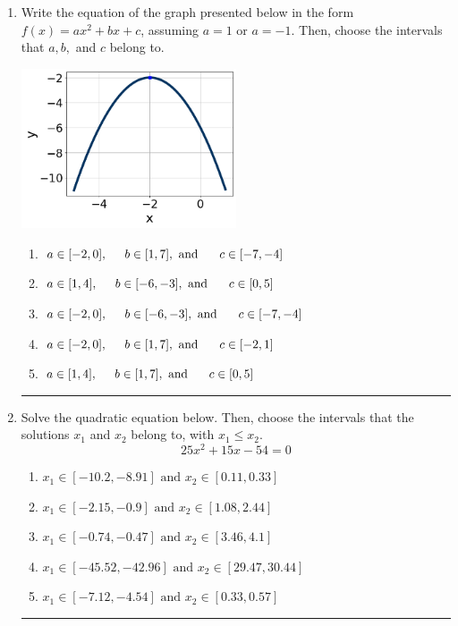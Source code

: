 \documentclass[14pt]{extbook}
\newcommand{\litem}[1]{\item#1\hspace*{-1cm}\rule{\textwidth}{0.4pt}}
\begin{document}
\begin{enumerate}
{\begin{enumerate}[label=\Alph*.]
\end{enumerate} }
\litem{
Write the equation of the graph presented below in the form $f(x)=ax^2+bx+c$, assuming  $a=1$ or $a=-1$. Then, choose the intervals that $a, b,$ and $c$ belong to.
\begin{center}
    \includegraphics[width=0.5\textwidth]{../Figures/quadraticGraphToEquationCopyB.png}
\end{center}
\begin{enumerate}[label=\Alph*.]
\item \( a \in [-2, 0], \hspace*{5mm} b \in [1, 7], \text{ and } \hspace*{5mm} c \in [-7, -4] \)
\item \( a \in [1, 4], \hspace*{5mm} b \in [-6, -3], \text{ and } \hspace*{5mm} c \in [0, 5] \)
\item \( a \in [-2, 0], \hspace*{5mm} b \in [-6, -3], \text{ and } \hspace*{5mm} c \in [-7, -4] \)
\item \( a \in [-2, 0], \hspace*{5mm} b \in [1, 7], \text{ and } \hspace*{5mm} c \in [-2, 1] \)
\item \( a \in [1, 4], \hspace*{5mm} b \in [1, 7], \text{ and } \hspace*{5mm} c \in [0, 5] \)

\end{enumerate} }
\litem{
Solve the quadratic equation below. Then, choose the intervals that the solutions $x_1$ and $x_2$ belong to, with $x_1 \leq x_2$.\[ 25x^{2} +15 x -54 = 0 \]\begin{enumerate}[label=\Alph*.]
\item \( x_1 \in [-10.2, -8.91] \text{ and } x_2 \in [0.11, 0.33] \)
\item \( x_1 \in [-2.15, -0.9] \text{ and } x_2 \in [1.08, 2.44] \)
\item \( x_1 \in [-0.74, -0.47] \text{ and } x_2 \in [3.46, 4.1] \)
\item \( x_1 \in [-45.52, -42.96] \text{ and } x_2 \in [29.47, 30.44] \)
\item \( x_1 \in [-7.12, -4.54] \text{ and } x_2 \in [0.33, 0.57] \)


\end{enumerate}}
\end{enumerate}
\end{document}
